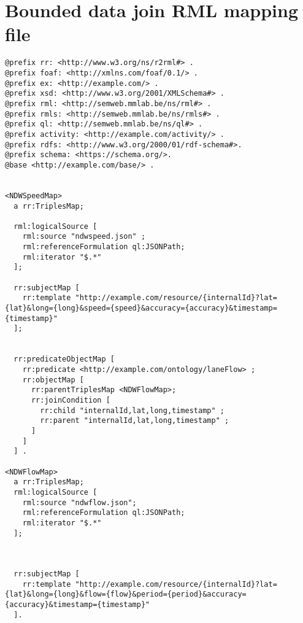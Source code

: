 \section{Bounded data join RML mapping file}
\begin{lstlisting}[label={lst:bounded_mapping_file}]
@prefix rr: <http://www.w3.org/ns/r2rml#> .
@prefix foaf: <http://xmlns.com/foaf/0.1/> .
@prefix ex: <http://example.com/> .
@prefix xsd: <http://www.w3.org/2001/XMLSchema#> .
@prefix rml: <http://semweb.mmlab.be/ns/rml#> .
@prefix rmls: <http://semweb.mmlab.be/ns/rmls#> .
@prefix ql: <http://semweb.mmlab.be/ns/ql#> .
@prefix activity: <http://example.com/activity/> .
@prefix rdfs: <http://www.w3.org/2000/01/rdf-schema#>.
@prefix schema: <https://schema.org/>. 
@base <http://example.com/base/> .


<NDWSpeedMap>
  a rr:TriplesMap;

  rml:logicalSource [
    rml:source "ndwspeed.json" ;
    rml:referenceFormulation ql:JSONPath; 
    rml:iterator "$.*"
  ];

  rr:subjectMap [
    rr:template "http://example.com/resource/{internalId}?lat={lat}&long={long}&speed={speed}&accuracy={accuracy}&timestamp={timestamp}"
  ];

  
  rr:predicateObjectMap [
    rr:predicate <http://example.com/ontology/laneFlow> ;
    rr:objectMap [
      rr:parentTriplesMap <NDWFlowMap>;
      rr:joinCondition [
        rr:child "internalId,lat,long,timestamp" ;
        rr:parent "internalId,lat,long,timestamp" ;
      ]
    ]
  ] .

<NDWFlowMap>
  a rr:TriplesMap;
  rml:logicalSource [
    rml:source "ndwflow.json";
    rml:referenceFormulation ql:JSONPath;
    rml:iterator "$.*"
  ];



  rr:subjectMap [
    rr:template "http://example.com/resource/{internalId}?lat={lat}&long={long}&flow={flow}&period={period}&accuracy={accuracy}&timestamp={timestamp}"
  ]. 
\end{lstlisting}

